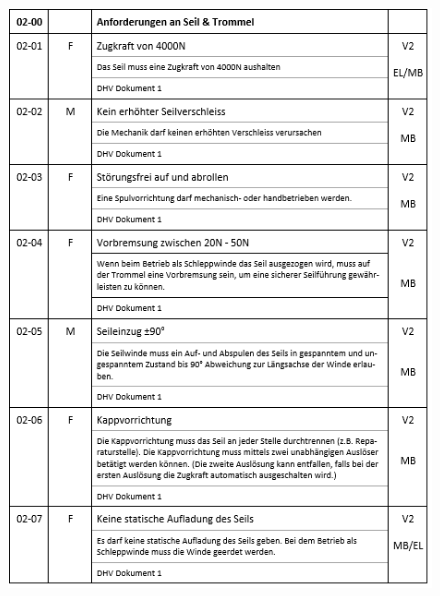 \begin{figure}[H]
	\begin{center}
		\includegraphics[width=155mm]{appendix/Anforderungen3.png}
	\end{center}
\end{figure}

